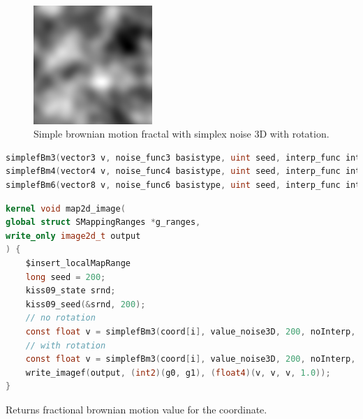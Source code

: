 \begin{figure}[h]
\centering
\includegraphics[width=0.4\textwidth]{out/simplefBm3/simplefBm3_simplex_noise3D_noInterp_rot.png}
\caption{Simple brownian motion fractal with simplex noise 3D with rotation.}
\label{fig:simple_bm3_simplex_noise3D_noInterp_rot}
\end{figure}

\begin{lstlisting}[caption={Definition of simple brownian motion fractal functions},label={lst:simple_bm_fractal_definition},language=OpenCL]
simplefBm3(vector3 v, noise_func3 basistype, uint seed, interp_func interp, random_func rnd, void *srnd, uint numoctaves, REAL frequency, bool rot);
simplefBm4(vector4 v, noise_func4 basistype, uint seed, interp_func interp, random_func rnd, void *srnd, uint numoctaves, REAL frequency, bool rot);
simplefBm6(vector8 v, noise_func6 basistype, uint seed, interp_func interp, random_func rnd, void *srnd, uint numoctaves, REAL frequency, bool rot);
\end{lstlisting}

\begin{lstlisting}[caption={Example for simple brownian motion fractal functions},label={lst:simple_bm_fractal_example},language=OpenCL]
kernel void map2d_image(
global struct SMappingRanges *g_ranges,
write_only image2d_t output
) {
    $insert_localMapRange
    long seed = 200;
    kiss09_state srnd;
    kiss09_seed(&srnd, 200);
    // no rotation
    const float v = simplefBm3(coord[i], value_noise3D, 200, noInterp, random_kiss09, &srnd, 3, 0.125, false);
    // with rotation
    const float v = simplefBm3(coord[i], value_noise3D, 200, noInterp, random_kiss09, &srnd, 3, 0.125, true);
    write_imagef(output, (int2)(g0, g1), (float4)(v, v, v, 1.0));
}
\end{lstlisting}

Returns fractional brownian motion value for the coordinate.

